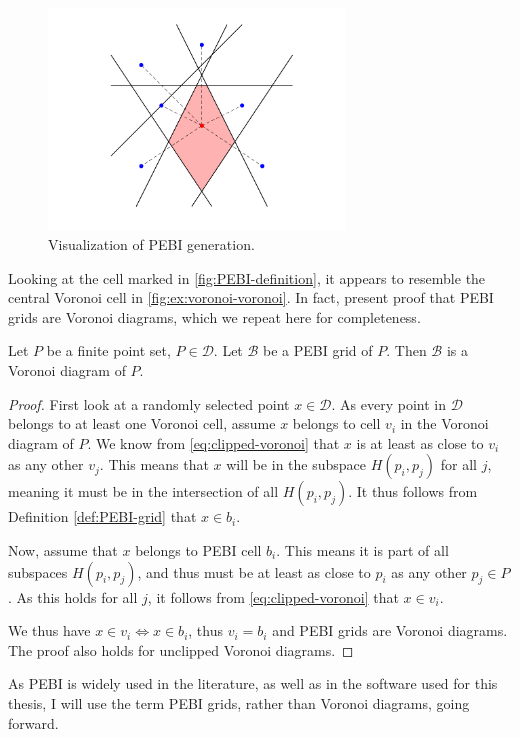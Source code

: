 \begin{figure}[ht]
    \centering
    \includegraphics[width=0.7\textwidth]{report/Images/Theory/PEBI_definition.png}
    \caption{Visualization of PEBI generation.}
    \label{fig:PEBI-definition}
\end{figure}

Looking at the cell marked in \autoref{fig:PEBI-definition}, it appears to resemble the central Voronoi cell in \autoref{fig:ex:voronoi-voronoi}. In fact, \textcite{UPR_chapter} present proof that PEBI grids are Voronoi diagrams, which we repeat here for completeness.

\begin{theorem}
\label{theorem:PEBI-voronoi}
Let $P$ be a finite point set, $P \in \mathcal{D}$. Let $\mathcal{B}$ be a PEBI grid of $P$. Then $\mathcal{B}$ is a Voronoi diagram of $P$.
\end{theorem}
\begin{proof}
First look at a randomly selected point $x \in \mathcal{D}$. As every point in $\mathcal{D}$ belongs to at least one Voronoi cell, assume $x$ belongs to cell $v_i$ in the Voronoi diagram of $P$. We know from  \autoref{eq:clipped-voronoi} that $x$ is at least as close to $v_i$ as any other $v_j$. This means that $x$ will be in the subspace $H(p_i, p_j)$ for all $j$, meaning it must be in the intersection of all $H(p_i, p_j)$. It thus follows from Definition \ref{def:PEBI-grid} that $x \in b_i$.

Now, assume that $x$ belongs to PEBI cell $b_i$. This means it is part of all subspaces $H(p_i, p_j)$, and thus must be at least as close to $p_i$ as any other $p_j \in P$. As this holds for all $j$, it follows from \autoref{eq:clipped-voronoi} that $x \in v_i$.

We thus have $x \in v_i \iff x \in b_i$, thus $v_i = b_i$ and PEBI grids are Voronoi diagrams. The proof also holds for unclipped Voronoi diagrams.
\end{proof}

As PEBI is widely used in the literature, as well as in the software used for this thesis, I will use the term PEBI grids, rather than Voronoi diagrams, going forward.

